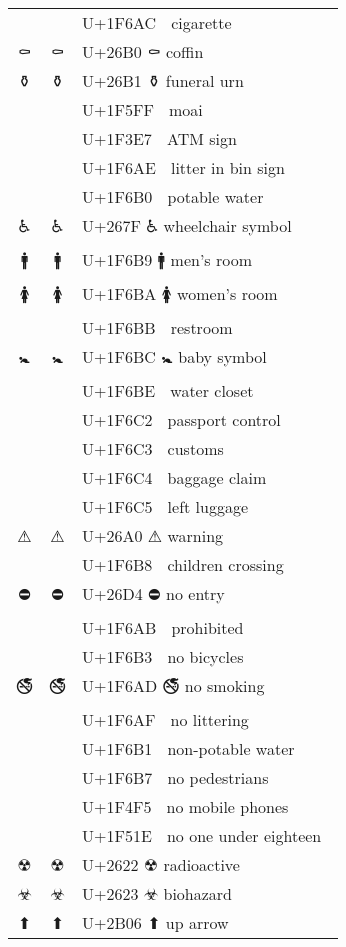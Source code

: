 \documentclass[a4paper,12pt]{ltjarticle}
\newcommand{\fontA}[1]{{\fontspec[RawFeature={mode=harf,+dist,+ccmp}]{Segoe UI Emoji} #1}}
\newcommand{\fontB}[1]{{\fontspec[RawFeature={mode=harf,+dist,+ccmp}]{Noto Color Emoji} #1}}
\begin{document}
\begin{longtable}[c]{ccp{0.8\linewidth}}
\fontA{🚬}&\fontB{🚬}&U+1F6AC 🚬 cigarette\\
\fontA{⚰}&\fontB{⚰}&U+26B0 ⚰ coffin\\
\fontA{⚱}&\fontB{⚱}&U+26B1 ⚱ funeral urn\\
\fontA{🗿}&\fontB{🗿}&U+1F5FF 🗿 moai\\
\fontA{🏧}&\fontB{🏧}&U+1F3E7 🏧 ATM sign\\
\fontA{🚮}&\fontB{🚮}&U+1F6AE 🚮 litter in bin sign\\
\fontA{🚰}&\fontB{🚰}&U+1F6B0 🚰 potable water\\
\fontA{♿}&\fontB{♿}&U+267F ♿ wheelchair symbol\\
\fontA{🚹}&\fontB{🚹}&U+1F6B9 🚹 men’s room\\
\fontA{🚺}&\fontB{🚺}&U+1F6BA 🚺 women’s room\\
\fontA{🚻}&\fontB{🚻}&U+1F6BB 🚻 restroom\\
\fontA{🚼}&\fontB{🚼}&U+1F6BC 🚼 baby symbol\\
\fontA{🚾}&\fontB{🚾}&U+1F6BE 🚾 water closet\\
\fontA{🛂}&\fontB{🛂}&U+1F6C2 🛂 passport control\\
\fontA{🛃}&\fontB{🛃}&U+1F6C3 🛃 customs\\
\fontA{🛄}&\fontB{🛄}&U+1F6C4 🛄 baggage claim\\
\fontA{🛅}&\fontB{🛅}&U+1F6C5 🛅 left luggage\\
\fontA{⚠}&\fontB{⚠}&U+26A0 ⚠ warning\\
\fontA{🚸}&\fontB{🚸}&U+1F6B8 🚸 children crossing\\
\fontA{⛔}&\fontB{⛔}&U+26D4 ⛔ no entry\\
\fontA{🚫}&\fontB{🚫}&U+1F6AB 🚫 prohibited\\
\fontA{🚳}&\fontB{🚳}&U+1F6B3 🚳 no bicycles\\
\fontA{🚭}&\fontB{🚭}&U+1F6AD 🚭 no smoking\\
\fontA{🚯}&\fontB{🚯}&U+1F6AF 🚯 no littering\\
\fontA{🚱}&\fontB{🚱}&U+1F6B1 🚱 non-potable water\\
\fontA{🚷}&\fontB{🚷}&U+1F6B7 🚷 no pedestrians\\
\fontA{📵}&\fontB{📵}&U+1F4F5 📵 no mobile phones\\
\fontA{🔞}&\fontB{🔞}&U+1F51E 🔞 no one under eighteen\\
\fontA{☢}&\fontB{☢}&U+2622 ☢ radioactive\\
\fontA{☣}&\fontB{☣}&U+2623 ☣ biohazard\\
\fontA{⬆}&\fontB{⬆}&U+2B06 ⬆ up arrow\\

\end{longtable}
\end{document}
